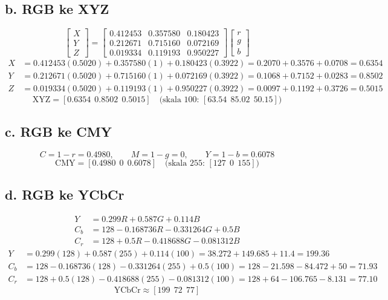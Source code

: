 \documentclass[11pt,a4paper]{article}
\begin{document}
\subsection*{b. RGB ke XYZ}
\[
\begin{bmatrix} X \\ Y \\ Z \end{bmatrix} =
\begin{bmatrix}
0.412453 & 0.357580 & 0.180423\\
0.212671 & 0.715160 & 0.072169\\
0.019334 & 0.119193 & 0.950227
\end{bmatrix}
\begin{bmatrix} r \\ g \\ b \end{bmatrix}
\]
\begin{align*}
X &= 0.412453(0.5020) + 0.357580(1) + 0.180423(0.3922) = 0.2070 + 0.3576 + 0.0708 = 0.6354\\
Y &= 0.212671(0.5020) + 0.715160(1) + 0.072169(0.3922) = 0.1068 + 0.7152 + 0.0283 = 0.8502\\
Z &= 0.019334(0.5020) + 0.119193(1) + 0.950227(0.3922) = 0.0097 + 0.1192 + 0.3726 = 0.5015
\end{align*}
\[
\boxed{\text{XYZ} = [0.6354\ \ 0.8502\ \ 0.5015]}\quad\text{(skala 100: } [63.54\ \ 85.02\ \ 50.15])
\]

\subsection*{c. RGB ke CMY}
\[
C = 1 - r = 0.4980,\qquad M = 1 - g = 0,\qquad Y = 1 - b = 0.6078
\]
\[
\boxed{\text{CMY} = [0.4980\ \ 0\ \ 0.6078]}\quad\text{(skala 255: } [127\ \ 0\ \ 155])
\]

\subsection*{d. RGB ke YCbCr}
\begin{align*}
Y  &= 0.299R + 0.587G + 0.114B\\
C_b &= 128 - 0.168736R - 0.331264G + 0.5B\\
C_r &= 128 + 0.5R - 0.418688G - 0.081312B
\end{align*}
\begin{align*}
Y  &= 0.299(128) + 0.587(255) + 0.114(100) = 38.272 + 149.685 + 11.4 = 199.36\\
C_b &= 128 - 0.168736(128) - 0.331264(255) + 0.5(100) = 128 - 21.598 - 84.472 + 50 = 71.93\\
C_r &= 128 + 0.5(128) - 0.418688(255) - 0.081312(100) = 128 + 64 - 106.765 - 8.131 = 77.10
\end{align*}
\[
\boxed{\text{YCbCr} \approx [199\ \ 72\ \ 77]}
\]
\end{document}
